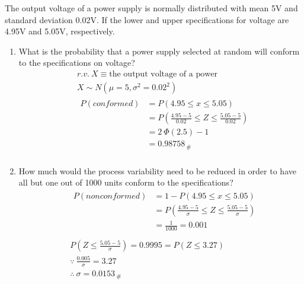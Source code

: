 The output voltage of a power supply is normally distributed with mean 5V and standard deviation 0.02V. If the lower and upper specifications for voltage are 4.95V and 5.05V, respectively.
\begin{enumerate}
    \item What is the probability that a power supply selected at random will conform to the specifications on voltage?
        \begin{align*}
            &r.v. \ X \equiv \text{the output voltage of a power}\\
            &X \sim N(\mu = 5, \sigma^2 = 0.02^2)\\
            &\begin{aligned}
                P(conformed) &= P\left(4.95 \leq x \leq 5.05\right)\\
                &= P\left(\frac{4.95 - 5}{0.02} \leq Z \leq \frac{5.05- 5}{0.02}\right)\\
                &= 2 \ \Phi(2.5) - 1\\
                &= 0.98758_{ \ \#}\\
            \end{aligned}
        \end{align*} 

    \item How much would the process variability need to be reduced in order to have all but one out of 1000 units conform to the specifications?
        \begin{align*}
            &\begin{aligned}
                P(nonconformed) &= 1- P\left(4.95 \leq x \leq 5.05\right)\\
                &= P\left(\frac{4.95 - 5}{\sigma} \leq Z \leq \frac{5.05- 5}{\sigma}\right)\\
                &= \frac{1}{1000} = 0.001\\
            \end{aligned}\\
            &P\left(Z \leq \frac{5.05 - 5}{\sigma}\right) = 0.9995 = P\left(Z \leq 3.27\right)\\
            &\because \ \frac{0.005}{\sigma} = 3.27\\
            &\therefore \ \sigma = 0.0153_{ \ \#}\\
        \end{align*}
        
    \end{enumerate}
